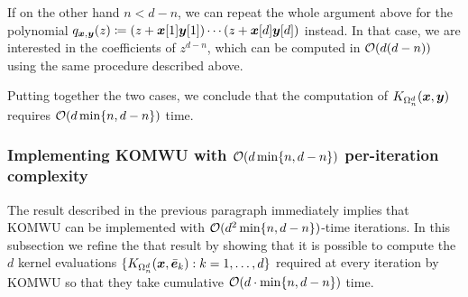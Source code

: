 If on the other hand $n < d-n$, we can repeat the whole argument above for the polynomial
$q_{\bm{x},\bm{y}}(z) \coloneqq (z + \bm{x}[1]\bm{y}[1]) \cdots (z + \bm{x}[d]\bm{y}[d])$ instead. In that case, we are interested in the coefficients of $z^{d-n}$, which can be computed in $\mathcal{O}(d(d-n))$ using the same procedure described above.

Putting together the two cases, we conclude that the computation of $K_{\Omega^d_n}(\bm{x},\bm{y})$ requires $\mathcal{O}(d\min\{n,d-n\})$ time.


\subsubsection{Implementing KOMWU with $\mathcal{O}(d\min\{n, d-n\})$ per-iteration complexity}
The result described in the previous paragraph immediately implies that KOMWU can be implemented with $\mathcal{O}(d^2\min\{n,d-n\})$-time iterations. In this subsection we refine the that result by showing that it is possible to compute the $d$ kernel evaluations $\{K_{{\Omega^d_n}}(\bm{x},\bar{\bm{e}}_k) : k =1,\dots,d\}$ required at every iteration by KOMWU so that they take cumulative $\mathcal{O}(d\cdot\min\{n,d-n\})$ time.

